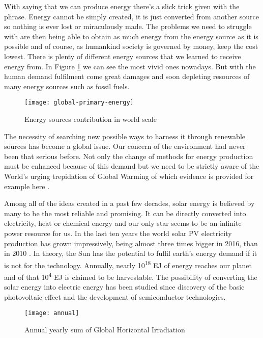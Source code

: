 With saying that we can produce energy there's a slick trick given with
the phrase. Energy cannot be simply created, it is just converted from
another source so nothing is ever lost or miraculously made. The
problems we need to struggle with are then being able to obtain as much
energy from the energy source as it is possible and of course, as
humankind society is governed by money, keep the cost lowest. There is
plenty of different energy sources that we learned to receive energy
from. In Figure \ref{fig:ensour} we can see the most vivid ones nowadays. But with
the human demand fulfilment come great damages and soon depleting
resources of many energy sources such as fossil fuels.

\begin{figure}[h]
\label{fig:ensour}
\centering
\texttt{[image: global-primary-energy]}
\caption{Energy sources contribution in world scale
\cite{2019}}
\end{figure}

The necessity of searching new possible ways to harness it through renewable sources has become a global issue. Our concern of the environment had never been that serious before. Not only the change of methods for energy production must be enhanced because of this demand but we need to be strictly aware of the World's urging trepidation of Global Warming of which evidence is provided for example here \cite{Nasa2019}.

\newpage
Among all of the ideas created in a past few decades, solar energy is
believed by many to be the most reliable and promising. It can be
directly converted into electricity, heat or chemical energy and our
only star seems to be an infinite power resource for us. In the last ten
years the world solar PV electricity production has grown impressively,
being almost three times bigger in 2016, than in 2010 \cite{2018}. In theory,
the Sun has the potential to fulfil earth's energy demand if it is not
for the technology. Annually, nearly 10\textsuperscript{18} EJ of energy
reaches our planet and of that 10\textsuperscript{4} EJ is claimed to be
harvestable. The possibility of converting the solar energy into
electric energy has been studied since discovery of the basic
photovoltaic effect and the development of semiconductor technologies.

\begin{figure}[h]
\label{fig:annual} 
\centering
\texttt{[image: annual]}
\caption{Annual yearly sum of Global Horizontal Irradiation
\cite{1991-2010}}
\end{figure}